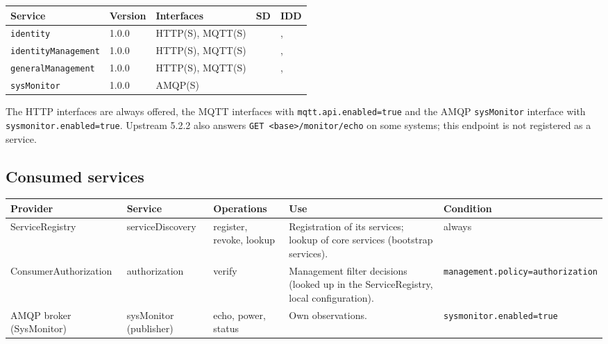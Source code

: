 \documentclass[a4paper]{arrowhead}
\begin{document}
\noindent\begin{longtable}{| p{5.3cm} | p{1.3cm} | p{2.6cm} | p{1.6cm} | p{3.6cm} |} \hline
\rowcolor{gray!33} Service & Version & Interfaces & SD & IDD \\ \hline \endhead
\texttt{identity} & 1.0.0 & HTTP(S), MQTT(S) & \cite{auth-identity-sd} & \cite{auth-identity-http-idd}, \cite{auth-identity-mqtt-idd} \\ \hline
\texttt{identityManagement} & 1.0.0 & HTTP(S), MQTT(S) & \cite{auth-identityManagement-sd} & \cite{auth-identityManagement-http-idd}, \cite{auth-identityManagement-mqtt-idd} \\ \hline
\texttt{generalManagement} & 1.0.0 & HTTP(S), MQTT(S) & \cite{auth-generalManagement-sd} & \cite{auth-generalManagement-http-idd}, \cite{auth-generalManagement-mqtt-idd} \\ \hline
\texttt{sysMonitor} & 1.0.0 & AMQP(S) & \cite{auth-sysMonitor-sd} & \cite{auth-sysMonitor-amqp-idd} \\ \hline
\end{longtable}

The HTTP interfaces are always offered, the MQTT interfaces with \texttt{mqtt.api.enabled=true} and the AMQP \texttt{sysMonitor} interface with \texttt{sysmonitor.enabled=true}. Upstream 5.2.2 also answers \texttt{GET <base>/monitor/echo} on some systems; this endpoint is not registered as a service.

\subsection{Consumed services}

\noindent\begin{longtable}{| >{\raggedright\arraybackslash}p{2.9cm} | >{\raggedright\arraybackslash}p{3.1cm} | >{\raggedright\arraybackslash}p{2.5cm} | p{3.6cm} | >{\raggedright\arraybackslash}p{2.9cm} |} \hline
\rowcolor{gray!33} Provider & Service & Operations & Use & Condition \\ \hline \endhead
ServiceRegistry & serviceDiscovery & register, revoke, lookup & Registration of its services; lookup of core services (bootstrap services). & always \\ \hline
Consumer\allowbreak{}Authorization & authorization & verify & Management filter decisions (looked up in the ServiceRegistry, local configuration). & \texttt{management.\allowbreak{}policy=\allowbreak{}authorization} \\ \hline
AMQP broker (SysMonitor) & sysMonitor (publisher) & echo, power, status & Own observations. & \texttt{sysmonitor.\allowbreak{}enabled=\allowbreak{}true} \\ \hline
\end{longtable}
\end{document}
